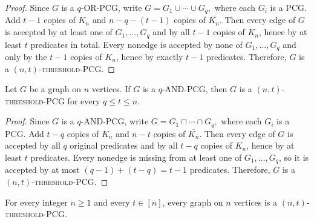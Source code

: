 \documentclass[a4paper,UKenglish,cleveref,autoref,thm-restate]{socg-lipics-v2021}
\begin{document}
\begin{proof}
Since $G$ is a \textsc{$q$-\textsc{OR}-\textsc{PCG}}, write 
\(
G = G_1 \cup \cdots \cup G_q,
\)
where each $G_i$ is a \textsc{PCG}. Add $t-1$ copies of $K_n$ and $n-q-(t-1)$ copies of $\overline{K_n}$. Then every edge of $G$ is accepted by at least one of $G_1,\dots,G_q$ and by all $t-1$ copies of $K_n$, hence by at least $t$ predicates in total. Every nonedge is accepted by none of $G_1,\dots,G_q$ and only by the $t-1$ copies of $K_n$, hence by exactly $t-1$ predicates. Therefore, $G$ is a \textsc{$(n,t)$-threshold-\textsc{PCG}}.
\end{proof}

\begin{lemma}\label{lem:and-to-threshold}
Let $G$ be a graph on $n$ vertices. If $G$ is a \textsc{$q$-\textsc{AND}-\textsc{PCG}}, then $G$ is a \textsc{$(n,t)$-threshold-\textsc{PCG}} for every
\(
q \le t \le n.
\)
\end{lemma}

\begin{proof}
Since $G$ is a \textsc{$q$-\textsc{AND}-\textsc{PCG}}, write
\(
G = G_1 \cap \cdots \cap G_q,
\)
where each $G_i$ is a \textsc{PCG}. Add $t-q$ copies of $K_n$ and $n-t$ copies of $\overline{K_n}$. Then every edge of $G$ is accepted by all $q$ original predicates and by all $t-q$ copies of $K_n$, hence by at least $t$ predicates. Every nonedge is missing from at least one of $G_1,\dots,G_q$, so it is accepted by at most $(q-1)+(t-q)=t-1$ predicates. Therefore, $G$ is a \textsc{$(n,t)$-threshold-\textsc{PCG}}.
\end{proof}

\begin{theorem}\label{thm:universality}
For every integer $n \ge 1$ and every $t \in [n]$, every graph on $n$ vertices is a \textsc{$(n,t)$-threshold-\textsc{PCG}}.
\end{theorem}
\end{document}
